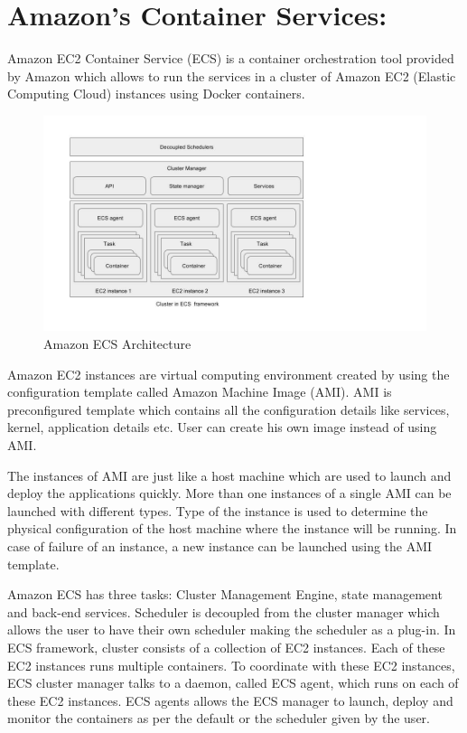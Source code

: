 \section{Amazon's Container Services:}
\label{sec:amazon}
Amazon EC2 Container Service (ECS) is a container orchestration tool provided by Amazon which allows to run the services in a cluster of Amazon EC2 (Elastic Computing Cloud) instances using Docker containers.

\begin{figure}
\centering
\includegraphics[scale=0.5]{./fig/ecs}
\caption{Amazon ECS Architecture}
\label{fig:ecsArch}
\end{figure}

Amazon EC2 instances are virtual computing environment created by using the configuration template called Amazon Machine Image (AMI). AMI is preconfigured template which contains all the configuration details like services, kernel, application details etc. User can create his own image instead of using AMI. 

The instances of AMI are just like a host machine which are used to launch and deploy the applications quickly. More than one instances of a single AMI can be launched with different types. Type of the instance is used to determine the physical configuration of the host machine where the instance will be running. In case of failure of an instance, a new instance can be launched using the AMI template.

Amazon ECS has three tasks: Cluster Management Engine, state management and back-end services. Scheduler is decoupled from the cluster manager which allows the user to have their own scheduler making the scheduler as a plug-in. In ECS framework, cluster consists of a collection of EC2 instances. Each of these EC2 instances runs multiple containers. To coordinate with these EC2 instances, ECS cluster manager talks to a daemon, called ECS agent, which runs on each of these EC2 instances. ECS agents allows the ECS manager to launch, deploy and monitor the containers as per the default or the scheduler given by the user.

